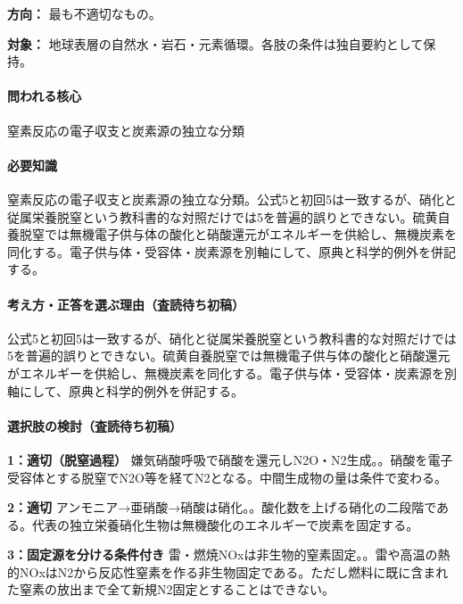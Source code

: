 \noindent\textbf{方向：} 最も不適切なもの。\par

\noindent\textbf{対象：} 地球表層の自然水・岩石・元素循環。各肢の条件は独自要約として保持。\par

\paragraph{問われる核心} 窒素反応の電子収支と炭素源の独立な分類

\paragraph{必要知識} 窒素反応の電子収支と炭素源の独立な分類。公式5と初回5は一致するが、硝化と従属栄養脱窒という教科書的な対照だけでは5を普遍的誤りとできない。硫黄自養脱窒では無機電子供与体の酸化と硝酸還元がエネルギーを供給し、無機炭素を同化する。電子供与体・受容体・炭素源を別軸にして、原典と科学的例外を併記する。

\paragraph{考え方・正答を選ぶ理由（査読待ち初稿）} 公式5と初回5は一致するが、硝化と従属栄養脱窒という教科書的な対照だけでは5を普遍的誤りとできない。硫黄自養脱窒では無機電子供与体の酸化と硝酸還元がエネルギーを供給し、無機炭素を同化する。電子供与体・受容体・炭素源を別軸にして、原典と科学的例外を併記する。

\paragraph{選択肢の検討（査読待ち初稿）}\mbox{}\par

\noindent\textbf{1：適切（脱窒過程）} 嫌気硝酸呼吸で硝酸を還元しN2O・N2生成。。硝酸を電子受容体とする脱窒でN2O等を経てN2となる。中間生成物の量は条件で変わる。\par

\noindent\textbf{2：適切} アンモニア→亜硝酸→硝酸は硝化。。酸化数を上げる硝化の二段階である。代表の独立栄養硝化生物は無機酸化のエネルギーで炭素を固定する。\par

\noindent\textbf{3：固定源を分ける条件付き} 雷・燃焼NOxは非生物的窒素固定。。雷や高温の熱的NOxはN2から反応性窒素を作る非生物固定である。ただし燃料に既に含まれた窒素の放出まで全て新規N2固定とすることはできない。\par


